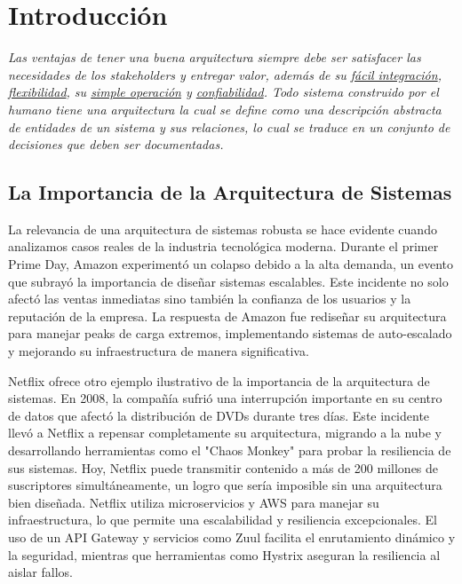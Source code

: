 \chapter{Introducción}
\vspace{140px}

\begin{flushright}
    \textit{Las ventajas de tener una buena arquitectura siempre debe ser satisfacer las necesidades de los stakeholders y entregar valor, además de su \underline{fácil integración}, \underline{flexibilidad}, su \underline{simple operación} y \underline{confiabilidad}. Todo sistema construido por el humano tiene una arquitectura la cual se define como una descripción abstracta de entidades de un sistema y sus relaciones, lo cual se traduce en un conjunto de decisiones que deben ser documentadas.}
\end{flushright}

\section{La Importancia de la Arquitectura de Sistemas}

La relevancia de una arquitectura de sistemas robusta se hace evidente cuando analizamos casos reales de la industria tecnológica moderna. Durante el primer Prime Day, Amazon experimentó un colapso debido a la alta demanda, un evento que subrayó la importancia de diseñar sistemas escalables. Este incidente no solo afectó las ventas inmediatas sino también la confianza de los usuarios y la reputación de la empresa. La respuesta de Amazon fue rediseñar su arquitectura para manejar peaks de carga extremos, implementando sistemas de auto-escalado y mejorando su infraestructura de manera significativa.

Netflix ofrece otro ejemplo ilustrativo de la importancia de la arquitectura de sistemas. En 2008, la compañía sufrió una interrupción importante en su centro de datos que afectó la distribución de DVDs durante tres días. Este incidente llevó a Netflix a repensar completamente su arquitectura, migrando a la nube y desarrollando herramientas como el "Chaos Monkey" para probar la resiliencia de sus sistemas. Hoy, Netflix puede transmitir contenido a más de 200 millones de suscriptores simultáneamente, un logro que sería imposible sin una arquitectura bien diseñada. Netflix utiliza microservicios y AWS para manejar su infraestructura, lo que permite una escalabilidad y resiliencia excepcionales. El uso de un API Gateway y servicios como Zuul facilita el enrutamiento dinámico y la seguridad, mientras que herramientas como Hystrix aseguran la resiliencia al aislar fallos.

